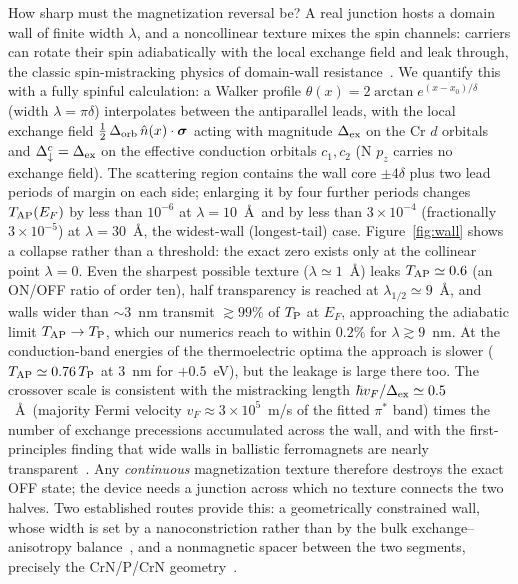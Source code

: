 \documentclass[preprint,12pt]{elsarticle}
\begin{document}
How sharp must the magnetization reversal be? A real junction hosts a domain wall of finite
width $\lambda$, and a noncollinear texture mixes the spin channels: carriers can rotate their
spin adiabatically with the local exchange field and leak through, the classic
spin-mistracking physics of domain-wall resistance~\cite{Cabrera1974,Tatara1997,vanHoof1999}.
We quantify this with a fully spinful calculation: a Walker profile
$\theta(x)=2\arctan e^{(x-x_0)/\delta}$ (width $\lambda=\pi\delta$) interpolates between the
antiparallel leads, with the local exchange field
$\tfrac{1}{2}\,\Delta_{\rm orb}\,\hat n(x)\cdot\boldsymbol\sigma$ acting with magnitude
$\Delta_{\rm ex}$ on the Cr $d$ orbitals and $\Delta^c_\downarrow=\Delta_{\rm ex}$ on the
effective conduction orbitals $c_1,c_2$ (N $p_z$ carries no exchange field). The scattering region
contains the wall core $\pm4\delta$ plus two lead periods of margin on each side; enlarging
it by four further periods changes $T_{\rm AP}(E_F)$ by less than $10^{-6}$ at
$\lambda=10$~\AA\ and by less than $3\times10^{-4}$ (fractionally $3\times10^{-5}$) at
$\lambda=30$~\AA, the widest-wall (longest-tail) case. Figure~\ref{fig:wall} shows a
collapse rather than a threshold: the exact zero exists only at the collinear point
$\lambda=0$. Even the sharpest possible texture ($\lambda\simeq1$~\AA) leaks
$T_{\rm AP}\simeq0.6$ (an ON/OFF ratio of order ten), half transparency is reached at
$\lambda_{1/2}\simeq9$~\AA, and walls wider than $\sim$$3$~nm transmit $\gtrsim99\%$ of
$T_{\rm P}$ at $E_F$, approaching the adiabatic limit $T_{\rm AP}\to T_{\rm P}$, which our
numerics reach to within $0.2\%$ for $\lambda\gtrsim9$~nm. At the conduction-band energies of
the thermoelectric optima the approach is slower ($T_{\rm AP}\simeq0.76\,T_{\rm P}$ at $3$~nm
for $+0.5$~eV), but the leakage is large there too. The
crossover scale is consistent with the mistracking length
$\hbar v_F/\Delta_{\rm ex}\simeq0.5$~\AA\ (majority Fermi velocity $v_F\approx3\times10^5$~m/s
of the fitted $\pi^*$ band) times the number of exchange precessions accumulated across the
wall, and with the first-principles finding that wide walls in ballistic ferromagnets are
nearly transparent~\cite{vanHoof1999}. Any \emph{continuous} magnetization texture therefore
destroys the exact OFF state; the device needs a junction across which no texture connects
the two halves. Two established routes provide this: a geometrically constrained
wall, whose width is set by a nanoconstriction rather than by the bulk exchange--anisotropy
balance~\cite{Bruno1999}, and a nonmagnetic spacer between the two segments, precisely the
CrN/P/CrN geometry~\cite{Modarresi2019}.
\end{document}
